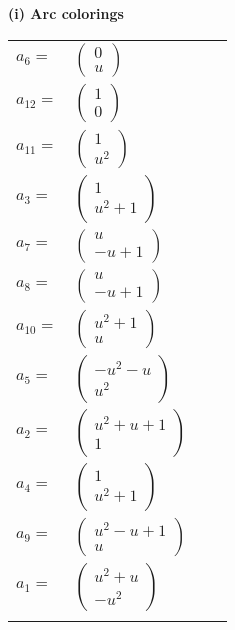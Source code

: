 \documentclass[1p]{elsarticle_modified}
\theoremstyle{definition}
\begin{document}
\flushleft \textbf{(i) Arc colorings}\\
\begin{tabular}{m{7pt} m{180pt} m{7pt} m{180pt} }
\flushright $a_{6}=$&$\begin{pmatrix}0\\u\end{pmatrix}$ \\
\flushright $a_{12}=$&$\begin{pmatrix}1\\0\end{pmatrix}$ \\
\flushright $a_{11}=$&$\begin{pmatrix}1\\u^2\end{pmatrix}$ \\
\flushright $a_{3}=$&$\begin{pmatrix}1\\u^2+1\end{pmatrix}$ \\
\flushright $a_{7}=$&$\begin{pmatrix}u\\- u+1\end{pmatrix}$ \\
\flushright $a_{8}=$&$\begin{pmatrix}u\\- u+1\end{pmatrix}$ \\
\flushright $a_{10}=$&$\begin{pmatrix}u^2+1\\u\end{pmatrix}$ \\
\flushright $a_{5}=$&$\begin{pmatrix}- u^2- u\\u^2\end{pmatrix}$ \\
\flushright $a_{2}=$&$\begin{pmatrix}u^2+u+1\\1\end{pmatrix}$ \\
\flushright $a_{4}=$&$\begin{pmatrix}1\\u^2+1\end{pmatrix}$ \\
\flushright $a_{9}=$&$\begin{pmatrix}u^2- u+1\\u\end{pmatrix}$ \\
\flushright $a_{1}=$&$\begin{pmatrix}u^2+u\\- u^2\end{pmatrix}$\\&\end{tabular}
\end{document}
